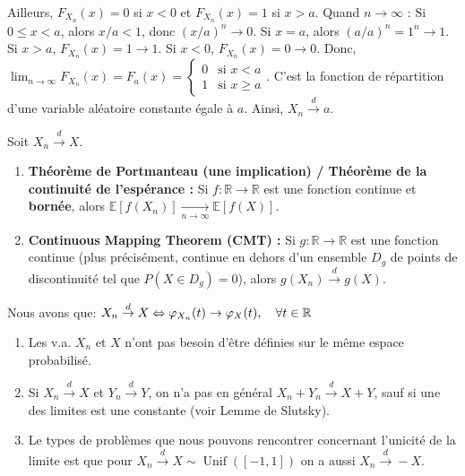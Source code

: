 \noindent Ailleurs, $F_{X_n}(x) = 0$ si $x < 0$ et $F_{X_n}(x) = 1$ si $x > a$. Quand $n \to \infty$ : Si $0 \le x < a$, alors $x/a < 1$, donc $(x/a)^n \to 0$. Si $x = a$, alors $(a/a)^n = 1^n \to 1$. Si $x > a$, $F_{X_n}(x) = 1 \to 1$. Si $x < 0$, $F_{X_n}(x) = 0 \to 0$. Donc, $\lim_{n \to \infty} F_{X_n}(x) = F_a(x) = \begin{cases} 0 & \text{si } x < a \\ 1 & \text{si } x \ge a \end{cases}$. C'est la fonction de répartition d'une variable aléatoire constante égale à $a$. Ainsi, $X_n \xrightarrow{d} a$.

\begin{proposition}
Soit $X_n \xrightarrow{d} X$.
\begin{enumerate}
    \item \textbf{Théorème de Portmanteau (une implication) / Théorème de la continuité de l'espérance :} Si $f : \mathbb{R} \to \mathbb{R}$ est une fonction continue et \textbf{bornée}, alors $\mathbb{E}[f(X_n)] \xrightarrow[n \to \infty]{} \mathbb{E}[f(X)]$.
    \item \textbf{Continuous Mapping Theorem (CMT) :} Si $g : \mathbb{R} \to \mathbb{R}$ est une fonction continue (plus précisément, continue en dehors d'un ensemble $D_g$ de points de discontinuité tel que $P(X \in D_g) = 0$), alors $g(X_n) \xrightarrow{d} g(X)$.
\end{enumerate}
\end{proposition}

\begin{proposition}
    Nous avons que:
    $X_n \overset{d}{\to}X \Leftrightarrow \varphi_{X_n}(t)\to \varphi_X(t), \quad \forall t\in \mathbb{R}$
\end{proposition}

\begin{remarque}
\begin{enumerate}
    \item Les v.a. $X_n$ et $X$ n'ont pas besoin d'être définies sur le même espace probabilisé.
    \item Si $X_n \xrightarrow{d} X$ et $Y_n \xrightarrow{d} Y$, on n'a pas en général $X_n + Y_n \xrightarrow{d} X + Y$, sauf si une des limites est une constante (voir Lemme de Slutsky).
    \item Le types de problèmes que nous pouvons rencontrer concernant l'unicité de la limite est que pour $X_n \overset{d}{\to}X\sim \operatorname{Unif}{([-1,1])}$ on a aussi $X_n \overset{d}{\to}-X$.
\end{enumerate}
\end{remarque}

